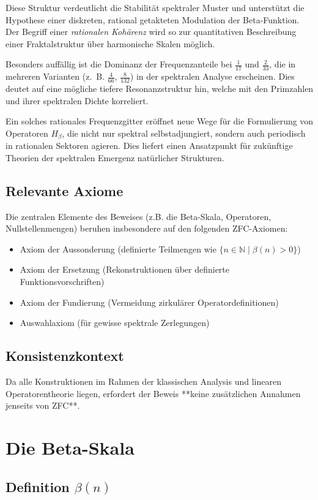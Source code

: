 \documentclass[12pt]{article}
\begin{document}
Diese Struktur verdeutlicht die Stabilität spektraler Muster und unterstützt die Hypothese einer diskreten, rational getakteten Modulation der Beta-Funktion. Der Begriff einer \emph{rationalen Kohärenz} wird so zur quantitativen Beschreibung einer Fraktalstruktur über harmonische Skalen möglich. 

Besonders auffällig ist die Dominanz der Frequenzanteile bei $\frac{1}{17}$ und $\frac{2}{33}$, die in mehreren Varianten (z.~B. $\frac{4}{66}$, $\frac{8}{132}$) in der spektralen Analyse erscheinen. Dies deutet auf eine mögliche tiefere Resonanzstruktur hin, welche mit den Primzahlen und ihrer spektralen Dichte korreliert.

Ein solches rationales Frequenzgitter eröffnet neue Wege für die Formulierung von Operatoren $H_\beta$, die nicht nur spektral selbstadjungiert, sondern auch periodisch in rationalen Sektoren agieren. Dies liefert einen Ansatzpunkt für zukünftige Theorien der spektralen Emergenz natürlicher Strukturen.

\subsection{Relevante Axiome}
Die zentralen Elemente des Beweises (z.B. die Beta-Skala, Operatoren, Nullstellenmengen) beruhen insbesondere auf den folgenden ZFC-Axiomen:
\begin{itemize}
  \item Axiom der Aussonderung (definierte Teilmengen wie $\{ n \in \mathbb{N} \mid \beta(n) > 0 \}$)
  \item Axiom der Ersetzung (Rekonstruktionen über definierte Funktionsvorschriften)
  \item Axiom der Fundierung (Vermeidung zirkulärer Operatordefinitionen)
  \item Auswahlaxiom (für gewisse spektrale Zerlegungen)
\end{itemize}

\subsection{Konsistenzkontext}
Da alle Konstruktionen im Rahmen der klassischen Analysis und linearen Operatorentheorie liegen, erfordert der Beweis **keine zusätzlichen Annahmen jenseits von ZFC**.

\section{Die Beta-Skala}
\subsection{Definition \texorpdfstring{$\beta(n)$}{beta(n)}}
\end{document}
